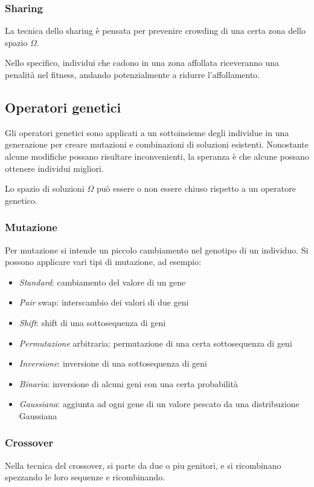 \documentclass[a4paper]{article}
\begin{document}
\subsubsection{Sharing}
La tecnica dello sharing è pensata per prevenire crowding di una certa zona 
dello spazio $\Omega$.

Nello specifico, individui che cadono in una zona affollata riceveranno una penalità
nel fitness, andando potenzialmente a ridurre l'affollamento.

\subsection{Operatori genetici}
Gli operatori genetici sono applicati a un sottoinsieme degli individue in 
una generazione per creare mutazioni e combinazioni di soluzioni esistenti.
Nonostante alcune modifiche possano risultare inconvenienti, la speranza è che 
alcune possano ottenere individui migliori.

Lo spazio di soluzioni $\Omega$ può essere o non essere chiuso rispetto 
a un operatore genetico.

\subsubsection{Mutazione}
Per mutazione si intende un piccolo cambiamento nel genotipo di un individuo.
Si possono applicare vari tipi di mutazione, ad esempio:
\begin{itemize}
    \item \emph{Standard}: cambiamento del valore di un gene
    \item \emph{Pair} swap: interscambio dei valori di due geni
    \item \emph{Shift}: shift di una sottosequenza di geni
    \item \emph{Permutazione} arbitraria: permutazione di una certa sottosequenza di geni
    \item \emph{Inversione}: inversione di una sottosequenza di geni
    \item \emph{Binaria}: inversione di alcuni geni con una certa probabilità
    \item \emph{Gaussiana}: aggiunta ad ogni gene di un valore pescato da una distribuzione Gaussiana
\end{itemize}
\subsubsection{Crossover}
Nella tecnica del crossover, si parte da due o piu genitori, e si ricombinano 
spezzando le loro sequenze e ricombinando.
\end{document}
